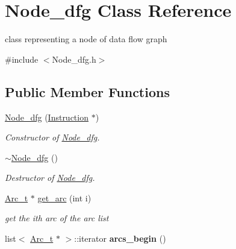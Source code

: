 \hypertarget{class_node__dfg}{\section{Node\-\_\-dfg Class Reference}
\label{class_node__dfg}
}


class representing a node of data flow graph  




{\ttfamily \#include $<$Node\-\_\-dfg.\-h$>$}

\subsection*{Public Member Functions}
\begin{DoxyCompactItemize}
\item 
\hypertarget{class_node__dfg_ac9b79961aaadf29eecd03b227b4c0875}{\hyperlink{class_node__dfg_ac9b79961aaadf29eecd03b227b4c0875}{Node\-\_\-dfg} (\hyperlink{class_instruction}{Instruction} $\ast$)}\label{class_node__dfg_ac9b79961aaadf29eecd03b227b4c0875}

\begin{DoxyCompactList}\small\item\em Constructor of \hyperlink{class_node__dfg}{Node\-\_\-dfg}. \end{DoxyCompactList}\item 
\hypertarget{class_node__dfg_a0a2a7c4634ad6802e7c69ab0d95957fa}{\hyperlink{class_node__dfg_a0a2a7c4634ad6802e7c69ab0d95957fa}{$\sim$\-Node\-\_\-dfg} ()}\label{class_node__dfg_a0a2a7c4634ad6802e7c69ab0d95957fa}

\begin{DoxyCompactList}\small\item\em Destructor of \hyperlink{class_node__dfg}{Node\-\_\-dfg}. \end{DoxyCompactList}\item 
\hypertarget{class_node__dfg_adc4a8e37604e57eec03fecaaca094fb5}{\hyperlink{struct_arc__t}{Arc\-\_\-t} $\ast$ \hyperlink{class_node__dfg_adc4a8e37604e57eec03fecaaca094fb5}{get\-\_\-arc} (int i)}\label{class_node__dfg_adc4a8e37604e57eec03fecaaca094fb5}

\begin{DoxyCompactList}\small\item\em get the ith arc of the arc list \end{DoxyCompactList}\item 
\hypertarget{class_node__dfg_a6ebd568efb70f729f6e355cdd46a5185}{list$<$ \hyperlink{struct_arc__t}{Arc\-\_\-t} $\ast$ $>$\-::iterator {\bfseries arcs\-\_\-begin} ()}\label{class_node__dfg_a6ebd568efb70f729f6e355cdd46a5185}


\end{DoxyCompactItemize}
